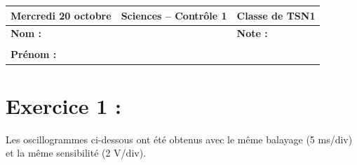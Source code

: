 \documentclass[11pt,a4paper]{article}
\begin{document}
\noindent
\begin{tabular}{|p{5cm}|p{5cm}|p{5cm}|}
\hline
\textbf{Mercredi 20 octobre} & \textbf{Sciences -- Contrôle 1} & \textbf{Classe de TSN1} \\
\hline
\textbf{Nom :} & & \textbf{Note :} \\
 & & \\
\textbf{Prénom :} & & \\
\hline
\end{tabular}

\vspace{1em}

\section*{Exercice 1 :}
Les oscillogrammes ci-dessous ont été obtenus avec le même balayage (5 ms/div) et la même sensibilité (2 V/div).

\vspace{0.5em}
\end{document}
